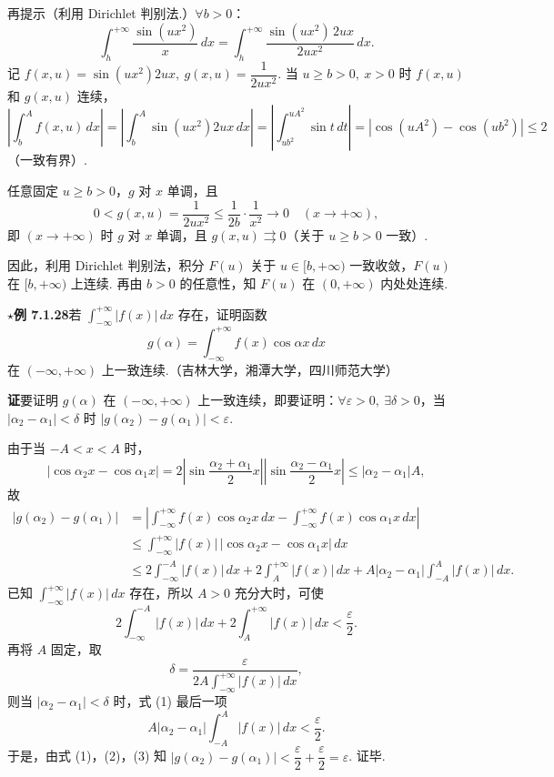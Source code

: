 \documentclass[UTF8,12pt,a4paper,fontset=fandol]{ctexart}
\begin{document}
再提示（利用 Dirichlet 判别法.）$\forall b>0$：
\[
\int_h^{+\infty}\frac{\sin(ux^2)}{x}\,dx
=\int_h^{+\infty}\frac{\sin(ux^2)\,2ux}{2ux^2}\,dx.
\]
记 $f(x,u)=\sin(ux^2)2ux,\ g(x,u)=\dfrac1{2ux^2}$. 当 $u\ge b>0,\ x>0$ 时 $f(x,u)$ 和 $g(x,u)$ 连续，
\[
\left|\int_b^A f(x,u)\,dx\right|
=\left|\int_b^A\sin(ux^2)2ux\,dx\right|
=\left|\int_{ub^2}^{uA^2}\sin t\,dt\right|
=|\cos(uA^2)-\cos(ub^2)|\le2
\]
（一致有界）.

任意固定 $u\ge b>0$，$g$ 对 $x$ 单调，且
\[
0<g(x,u)=\frac1{2ux^2}\le\frac1{2b}\cdot\frac1{x^2}\to0\quad(x\to+\infty),
\]
即 $(x\to+\infty)$ 时 $g$ 对 $x$ 单调，且 $g(x,u)\rightrightarrows0$（关于 $u\ge b>0$ 一致）.

因此，利用 Dirichlet 判别法，积分 $F(u)$ 关于 $u\in[b,+\infty)$ 一致收敛，$F(u)$ 在 $[b,+\infty)$ 上连续. 再由 $b>0$ 的任意性，知 $F(u)$ 在 $(0,+\infty)$ 内处处连续.

\noindent\textbf{$\star$例 7.1.28}\quad 若 $\displaystyle\int_{-\infty}^{+\infty}|f(x)|\,dx$ 存在，证明函数
\[
g(\alpha)=\int_{-\infty}^{+\infty}f(x)\cos\alpha x\,dx
\]
在 $(-\infty,+\infty)$ 上一致连续.（吉林大学，湘潭大学，四川师范大学）

\noindent\textbf{证}\quad 要证明 $g(\alpha)$ 在 $(-\infty,+\infty)$ 上一致连续，即要证明：$\forall\varepsilon>0,\ \exists\delta>0$，当 $|\alpha_2-\alpha_1|<\delta$ 时 $|g(\alpha_2)-g(\alpha_1)|<\varepsilon$.

由于当 $-A<x<A$ 时，
\[
|\cos\alpha_2x-\cos\alpha_1x|
=2\left|\sin\frac{\alpha_2+\alpha_1}{2}x\right|
\left|\sin\frac{\alpha_2-\alpha_1}{2}x\right|
\le|\alpha_2-\alpha_1|A,
\]
故
\begin{equation}
\begin{aligned}
|g(\alpha_2)-g(\alpha_1)|
&=\left|\int_{-\infty}^{+\infty}f(x)\cos\alpha_2x\,dx
-\int_{-\infty}^{+\infty}f(x)\cos\alpha_1x\,dx\right|\\
&\le\int_{-\infty}^{+\infty}|f(x)|\,|\cos\alpha_2x-\cos\alpha_1x|\,dx\\
&\le2\int_{-\infty}^{-A}|f(x)|\,dx+2\int_A^{+\infty}|f(x)|\,dx
+A|\alpha_2-\alpha_1|\int_{-A}^A|f(x)|\,dx.
\end{aligned}
\tag{1}
\end{equation}
已知 $\displaystyle\int_{-\infty}^{+\infty}|f(x)|\,dx$ 存在，所以 $A>0$ 充分大时，可使
\[
2\int_{-\infty}^{-A}|f(x)|\,dx+2\int_A^{+\infty}|f(x)|\,dx<\frac{\varepsilon}{2}.
\tag{2}
\]
再将 $A$ 固定，取
\[
\delta=\frac{\varepsilon}{2A\displaystyle\int_{-\infty}^{+\infty}|f(x)|\,dx},
\]
则当 $|\alpha_2-\alpha_1|<\delta$ 时，式 (1) 最后一项
\[
A|\alpha_2-\alpha_1|\int_{-A}^{A}|f(x)|\,dx<\frac{\varepsilon}{2}.
\tag{3}
\]
于是，由式 (1)，(2)，(3) 知 $|g(\alpha_2)-g(\alpha_1)|<\dfrac{\varepsilon}{2}+\dfrac{\varepsilon}{2}=\varepsilon$. 证毕.
\end{document}
